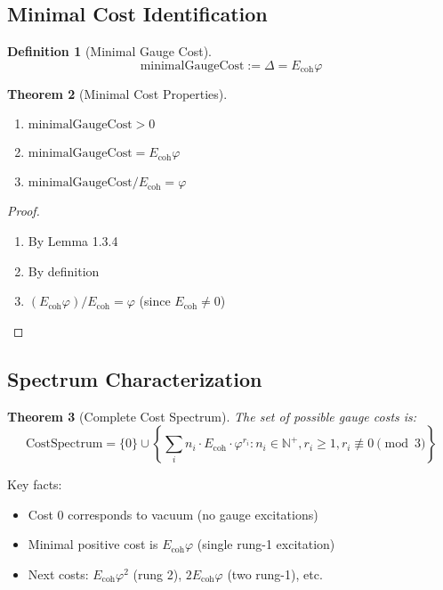 \documentclass[11pt]{article}
\numberwithin{equation}{section}
\newtheorem{theorem}{Theorem}[section]
\newtheorem{definition}[theorem]{Definition}
\theoremstyle{remark}
\newcommand{\Ecoh}{E_{\text{coh}}}
\newcommand{\massGap}{\Delta}
\newcommand{\N}{\mathbb{N}}
\begin{document}
\subsection{Minimal Cost Identification}

\begin{definition}[Minimal Gauge Cost]
\[\text{minimalGaugeCost} := \massGap = \Ecoh \varphi\]
\end{definition}

\begin{theorem}[Minimal Cost Properties]
\begin{enumerate}
\item $\text{minimalGaugeCost} > 0$
\item $\text{minimalGaugeCost} = \Ecoh \varphi$  
\item $\text{minimalGaugeCost} / \Ecoh = \varphi$
\end{enumerate}
\end{theorem}

\begin{proof}
\begin{enumerate}
\item By Lemma 1.3.4
\item By definition
\item $(\Ecoh \varphi) / \Ecoh = \varphi$ (since $\Ecoh \neq 0$)
\end{enumerate}
\end{proof}

\subsection{Spectrum Characterization}

\begin{theorem}[Complete Cost Spectrum]
The set of possible gauge costs is:
\[\text{CostSpectrum} = \{0\} \cup \left\{\sum_i n_i \cdot \Ecoh \cdot \varphi^{r_i} : n_i \in \N^+, r_i \geq 1, r_i \not\equiv 0 \pmod{3}\right\}\]
\end{theorem}

Key facts:
\begin{itemize}
\item Cost 0 corresponds to vacuum (no gauge excitations)
\item Minimal positive cost is $\Ecoh \varphi$ (single rung-1 excitation)
\item Next costs: $\Ecoh \varphi^2$ (rung 2), $2 \Ecoh \varphi$ (two rung-1), etc.
\end{itemize}
\end{document}
